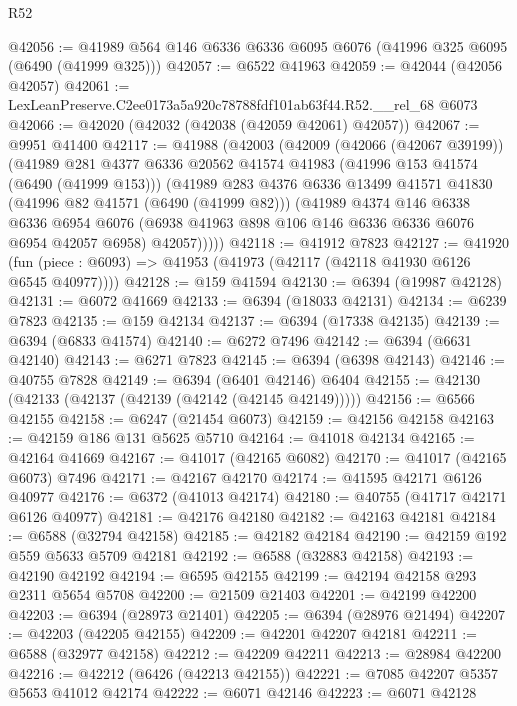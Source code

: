 \begin{lexlean}{R52}
\begin{coremodule}
@42056 := @41989 @564 @146 @6336 @6336 @6095 @6076 (@41996 @325 @6095 (@6490 (@41999 @325)))
@42057 := @6522 @41963
@42059 := @42044 (@42056 @42057)
@42061 := LexLeanPreserve.C2ee0173a5a920c78788fdf101ab63f44.R52.__rel_68 @6073
@42066 := @42020 (@42032 (@42038 (@42059 @42061) @42057))
@42067 := @9951 @41400
@42117 := @41988
    (@42003
      (@42009
        (@42066 (@42067 @39199))
        (@41989
          @281
          @4377
          @6336
          @20562
          @41574
          @41983
          (@41996 @153 @41574 (@6490 (@41999 @153)))
          (@41989
            @283
            @4376
            @6336
            @13499
            @41571
            @41830
            (@41996 @82 @41571 (@6490 (@41999 @82)))
            (@41989
              @4374
              @146
              @6338
              @6336
              @6954
              @6076
              (@6938 @41963 @898 @106 @146 @6336 @6336 @6076 @6954 @42057 @6958)
              @42057)))))
@42118 := @41912 @7823
@42127 := @41920
    (fun (piece : @6093) => @41953 (@41973 (@42117 (@42118 @41930 @6126 @6545 @40977))))
@42128 := @159 @41594
@42130 := @6394 (@19987 @42128)
@42131 := @6072 @41669
@42133 := @6394 (@18033 @42131)
@42134 := @6239 @7823
@42135 := @159 @42134
@42137 := @6394 (@17338 @42135)
@42139 := @6394 (@6833 @41574)
@42140 := @6272 @7496
@42142 := @6394 (@6631 @42140)
@42143 := @6271 @7823
@42145 := @6394 (@6398 @42143)
@42146 := @40755 @7828
@42149 := @6394 (@6401 @42146) @6404
@42155 := @42130 (@42133 (@42137 (@42139 (@42142 (@42145 @42149)))))
@42156 := @6566 @42155
@42158 := @6247 (@21454 @6073)
@42159 := @42156 @42158
@42163 := @42159 @186 @131 @5625 @5710
@42164 := @41018 @42134
@42165 := @42164 @41669
@42167 := @41017 (@42165 @6082)
@42170 := @41017 (@42165 @6073) @7496
@42171 := @42167 @42170
@42174 := @41595 @42171 @6126 @40977
@42176 := @6372 (@41013 @42174)
@42180 := @40755 (@41717 @42171 @6126 @40977)
@42181 := @42176 @42180
@42182 := @42163 @42181
@42184 := @6588 (@32794 @42158)
@42185 := @42182 @42184
@42190 := @42159 @192 @559 @5633 @5709 @42181
@42192 := @6588 (@32883 @42158)
@42193 := @42190 @42192
@42194 := @6595 @42155
@42199 := @42194 @42158 @293 @2311 @5654 @5708
@42200 := @21509 @21403
@42201 := @42199 @42200
@42203 := @6394 (@28973 @21401)
@42205 := @6394 (@28976 @21494)
@42207 := @42203 (@42205 @42155)
@42209 := @42201 @42207 @42181
@42211 := @6588 (@32977 @42158)
@42212 := @42209 @42211
@42213 := @28984 @42200
@42216 := @42212 (@6426 (@42213 @42155))
@42221 := @7085 @42207 @5357 @5653 @41012 @42174
@42222 := @6071 @42146
@42223 := @6071 @42128

\end{coremodule}
\end{lexlean}

